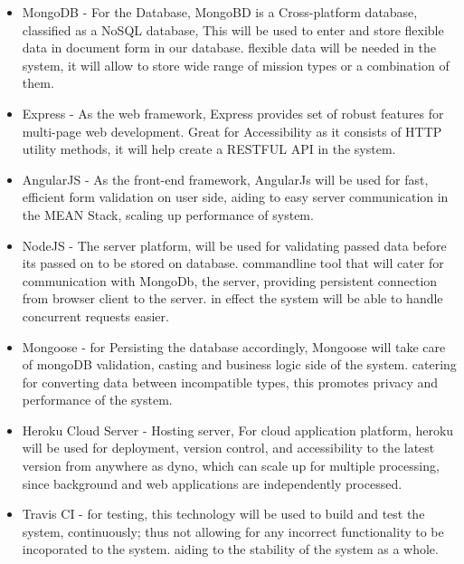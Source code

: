 \documentclass{article}
\begin{document}
	\begin{itemize}
	 
	 
	
	\item MongoDB - For the Database, MongoBD is a Cross-platform database, classified as a NoSQL database, This will be used to enter and store flexible data in document form in our database. flexible data will be needed in the system, it will allow to store wide range of mission types or a combination of them.
	
	
	\item Express - As the web framework, Express provides set of robust features for multi-page web development. Great for Accessibility as it consists of HTTP utility methods, it will help create a RESTFUL API in the system.
	
	
	\item AngularJS - As the front-end framework, AngularJs will be used for fast, efficient form validation on user side, aiding to easy server communication in the MEAN Stack, scaling up performance of system.     
	
	
	\item NodeJS - The server platform, will be used for validating passed data before its passed on to be stored on database. commandline  tool that will cater for  communication with MongoDb, the server, providing persistent connection from browser client to the server. in effect the system will be able to handle concurrent requests easier.
	
	\item Mongoose - for Persisting the database accordingly, Mongoose will take care of mongoDB validation, casting and business logic side of the system. catering for converting data between incompatible types, this promotes privacy and performance of the system.  
	
	
	\item Heroku Cloud Server - Hosting server, For cloud application platform, heroku will be used for deployment, version control, and accessibility to the latest version from anywhere as dyno, which can scale up for multiple processing, since background and web applications are independently processed.
	
	\item Travis CI - for testing, this technology will be used to build and test the system, continuously; thus not allowing for any incorrect functionality to be incoporated to the system. aiding to the stability of the system as a whole.   
	
	
	\end{itemize}
	
	
	
\end{document}
